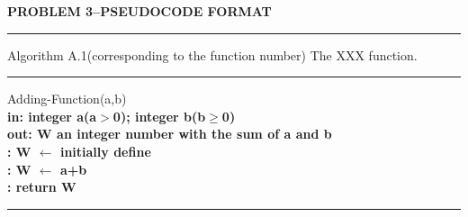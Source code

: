 \documentclass[a4paper, 11pt]{article}
\begin{document}
\noindent
\large\textbf{PROBLEM 3--PSEUDOCODE FORMAT}
\par\noindent\rule{\textwidth}{0.4pt}
Algorithm A.1(corresponding to the function number) The XXX function.
\par\noindent\rule{\textwidth}{0.2pt}
Adding-Function(a,b)\\
\indent \bfseries{in:}  \mdseries integer a(a$>$0); integer b(b$\geq$0) \\
\indent \bfseries{out:}  \mdseries W an integer number with the sum of a and b \\
: W $\leftarrow$ initially define \\
: W $\leftarrow$ a+b \\
: return W 
\par\noindent\rule{\textwidth}{0.2pt}
\end{document}
